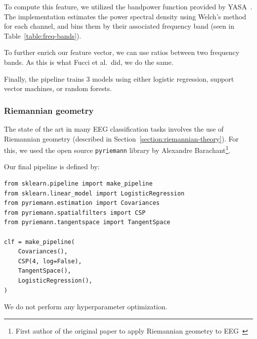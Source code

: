             To compute this feature, we utilized the bandpower function provided by YASA~\cite{vallat_yasa_2020}. The implementation estimates the power spectral density using Welch's method for each channel, and bins them by their associated frequency band (seen in Table~\ref{table:freq-bands}).

            To further enrich our feature vector, we can use ratios between two frequency bands. As this is what Fucci et al.\ did, we do the same.

            Finally, the pipeline trains 3 models using either logistic regression, support vector machines, or random forests.

        \subsubsection{Riemannian geometry}

            The state of the art in many EEG classification tasks involves the use of Riemannian geometry (described in Section~\ref{section:riemannian-theory}). For this, we used the open source \texttt{pyriemann} library by Alexandre Barachant\footnote{First author of the original paper to apply Riemannian geometry to EEG~\cite{barachant_classification_2013}}.

            Our final pipeline is defined by:

\begin{verbatim}
from sklearn.pipeline import make_pipeline
from sklearn.linear_model import LogisticRegression
from pyriemann.estimation import Covariances
from pyriemann.spatialfilters import CSP
from pyriemann.tangentspace import TangentSpace

clf = make_pipeline(
    Covariances(),
    CSP(4, log=False),
    TangentSpace(),
    LogisticRegression(),
)
\end{verbatim}

            We do not perform any hyperparameter optimization.

